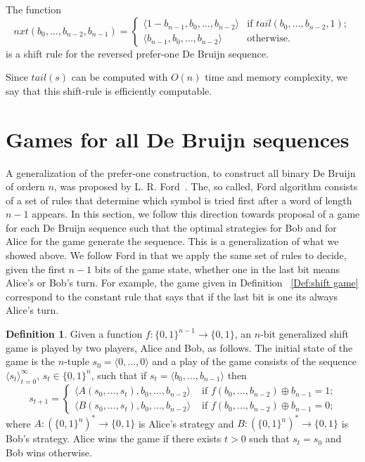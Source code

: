 \documentclass[final,12pt]{elsarticle}
\theoremstyle{definition} \newtheorem{definition}[theorem]{Definition} \newtheorem{observation}[theorem]{Observation} \newtheorem{example}[theorem]{Example} \newtheorem{remark}[theorem]{Remark} \newtheorem{corrolary}[theorem]{Corrolary}
\newcommand{\T}[1]{\langle{#1}\rangle} \DeclareMathOperator{\drop}{drop} \DeclareMathOperator{\dropbits}{drop\_bits} \DeclareMathOperator{\dropstates}{drop\_states} \DeclareMathOperator{\leadingForm}{LeadingForm} \DeclareMathOperator{\dv}{div} %
\begin{document}
\begin{proposition}
The function
$$nxt(b_0,\dots,b_{n-2},b_{n-1})=\begin{cases}
	\T{1-b_{n-1},b_0,\dots,b_{n-2}} & \text{if } tail(b_0,\dots,b_{n-2},1); \\
	\T{b_{n-1},b_0,\dots,b_{n-2}} & \text{otherwise.}
\end{cases}$$
is a shift rule for the reversed prefer-one De Bruijn sequence.
\end{proposition}


Since $tail(s)$ can be computed with $O(n)$ time and memory complexity, we say that this shift-rule is efficiently computable.

\section{Games for all De Bruijn sequences} 
\label{sec:games-for-all-DB-seq}

A generalization of the prefer-one construction, to construct all binary De Bruijn of ordern $n$, was proposed by L. R. Ford~\cite{ford1957cyclic}. The, so called, Ford algorithm consists of a set of rules that determine which symbol is tried first after a word of length $n-1$ appears. In this section, we follow this direction towards proposal of a game for each De Bruijn sequence such that the optimal strategies for Bob and for Alice for the game generate the sequence. This is a generalization of what we showed above. We follow Ford in that we apply the same set of rules to decide, given the first $n-1$ bits of the game state, whether one in the last bit means Alice's or Bob's turn. For example, the game given in Definition~   \ref{Def:shift game} correspond to the constant rule that says that if the last bit is one its always Alice's turn.

\begin{definition}
	\label{Def:generalized-shift game} Given a function $f\colon \{0,1\}^{n-1} \to \{0,1\}$, an $n$-bit generalized shift game is played by two players, Alice and Bob, as follows. The initial state of the game is the $n$-tuple $s_0=
		\T{0,\dots,0}$ and a play of the game consists of the sequence $
		\T{s_t }_{t=0}^\infty$, $s_t \in \{0,1\}^n$, such that if $s_t=
		\T{b_0, \dots, b_{n-1}}$ then $$s_{t+1} =
		\begin{cases}
			\T{ A(s_0,\dots,s_t), b_0, \dots, b_{n-2}} & \text{ if $f(b_0,\dots,b_{n-2}) \oplus b_{n-1} = 1$;} \\
			\T{ B(s_0,\dots,s_t), b_0, \dots, b_{n-2}} & \text{ if $f(b_0,\dots,b_{n-2}) \oplus b_{n-1} = 0$;}
		\end{cases}
	$$ where $A\colon(\{0,1\}^n)^* \to \{0,1\}$ is Alice's strategy and $B\colon (\{0,1\}^n)^* \to \{0,1\}$ is Bob's strategy. Alice wins the game if there exists $t>0$ such that $s_t=s_0$ and Bob wins otherwise.
\end{definition}
\end{document}
